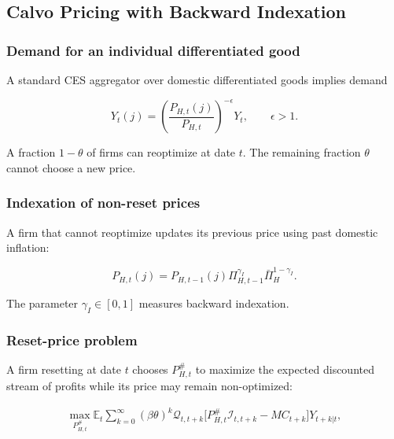 \subsection{Calvo Pricing with Backward Indexation}
\label{app:calvo}

\subsubsection{Demand for an individual differentiated good}

A standard CES aggregator over domestic differentiated goods implies demand

\begin{equation}
Y_t(j)
=
\left(
\frac{P_{H,t}(j)}{P_{H,t}}
\right)^{-\epsilon}
Y_t,
\qquad
\epsilon>1.
\label{eq:firm_demand}
\end{equation}

A fraction \(1-\theta\) of firms can reoptimize at date \(t\). The remaining
fraction \(\theta\) cannot choose a new price.

\subsubsection{Indexation of non-reset prices}

A firm that cannot reoptimize updates its previous price using past domestic
inflation:

\begin{equation}
P_{H,t}(j)
=
P_{H,t-1}(j)
\Pi_{H,t-1}^{\gamma_I}
\bar\Pi_H^{1-\gamma_I}.
\label{eq:indexation_rule}
\end{equation}

The parameter \(\gamma_I\in[0,1]\) measures backward indexation.

\subsubsection{Reset-price problem}

A firm resetting at date \(t\) chooses \(P_{H,t}^{\#}\) to maximize the expected
discounted stream of profits while its price may remain non-optimized:

\begin{align}
\max_{P_{H,t}^{\#}}
\mathbb E_t
\sum_{k=0}^{\infty}
(\beta\theta)^k
\mathcal Q_{t,t+k}
\Big[
P_{H,t}^{\#}\mathcal I_{t,t+k}
-
MC_{t+k}
\Big]
Y_{t+k|t},
\label{eq:reset_problem}
\end{align}

